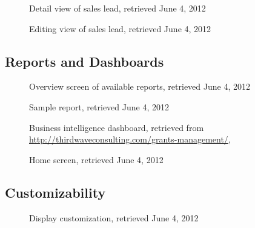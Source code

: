 \begin{figure}[htbp]
	\centering
	\caption[salesforce.com: Detail view of sales lead]{Detail view of sales lead, retrieved June 4, 2012}
\end{figure}

\begin{figure}[htbp]
	\centering
	\caption[salesforce.com: Editing view of sales lead]{Editing view of sales lead, retrieved June 4, 2012}
\end{figure}

\FloatBarrier
\subsection{Reports and Dashboards}
\begin{figure}[htbp]
	\centering
	\caption[salesforce.com: Overview screen of available reports]{Overview screen of available reports, retrieved June 4, 2012}
\end{figure}

\begin{figure}[htbp]
	\centering
	\caption[salesforce.com: Sample report]{Sample report, retrieved June 4, 2012}
\end{figure}

\begin{figure}[htbp]
	\centering
	\caption[salesforce.com: Business intelligence dashboard]{Business intelligence dashboard, retrieved from \url{http://thirdwaveconsulting.com/grants-management/}, \downloadDate}
\end{figure}

\begin{figure}[htbp]
	\centering
	\caption[salesforce.com: Home screen]{Home screen, retrieved June 4, 2012}
\end{figure}

\FloatBarrier
\subsection{Customizability}
\begin{figure}[htbp]
	\centering
	\caption[salesforce.com: Display customization]{Display customization, retrieved June 4, 2012}
\end{figure}

